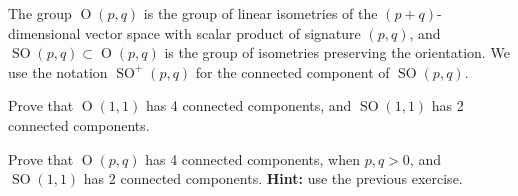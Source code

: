 \documentclass{article}
\numberwithin{equation}{section}
\renewcommand{\O}{\operatorname{O}}
\DeclareMathOperator{\SO}{SO}
\begin{document}
\begin{defn}
	The group $\O(p,q)$ is the group of linear isometries of the $(p+q)$-dimensional vector space with scalar product of signature $(p,q)$, and $\SO(p,q)\subset\O(p,q)$ is the group of isometries preserving the orientation. We use the notation $\SO^+(p,q)$ for the connected component of $\SO(p,q)$.
\end{defn}
\begin{exercise}\label{ex:2.2}
	Prove that $\O(1,1)$ has 4 connected components, and $\SO(1,1)$ has 2 connected components.
\end{exercise}
\begin{exercise}\label{ex:2.3}
	Prove that $\O(p,q)$ has 4 connected components, when $p,q>0$, and $\SO(1,1)$ has 2 connected components. \textbf{Hint:} use the previous exercise.
\end{exercise}
\end{document}
